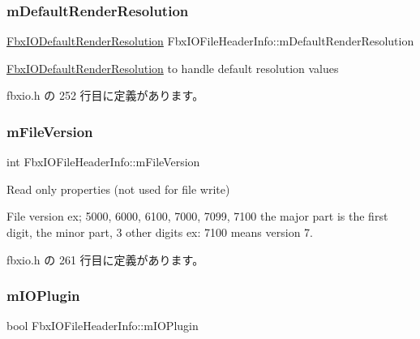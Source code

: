 \subsubsection{\texorpdfstring{m\+Default\+Render\+Resolution}{mDefaultRenderResolution}}
{\footnotesize\ttfamily \hyperlink{class_fbx_i_o_default_render_resolution}{Fbx\+I\+O\+Default\+Render\+Resolution} Fbx\+I\+O\+File\+Header\+Info\+::m\+Default\+Render\+Resolution}



\hyperlink{class_fbx_i_o_default_render_resolution}{Fbx\+I\+O\+Default\+Render\+Resolution} to handle default resolution values 



 fbxio.\+h の 252 行目に定義があります。

\mbox{\label{class_fbx_i_o_file_header_info_ab344842c3191b6082e271c6768fe0eb6}} 
\subsubsection{\texorpdfstring{m\+File\+Version}{mFileVersion}}
{\footnotesize\ttfamily int Fbx\+I\+O\+File\+Header\+Info\+::m\+File\+Version}



Read only properties (not used for file write) 

File version ex; 5000, 6000, 6100, 7000, 7099, 7100 the major part is the first digit, the minor part, 3 other digits ex\+: 7100 means version 7. 

 fbxio.\+h の 261 行目に定義があります。

\mbox{\label{class_fbx_i_o_file_header_info_a76db06e54a4c3fbc382e630271d5e853}} 
\subsubsection{\texorpdfstring{m\+I\+O\+Plugin}{mIOPlugin}}
{\footnotesize\ttfamily bool Fbx\+I\+O\+File\+Header\+Info\+::m\+I\+O\+Plugin}

